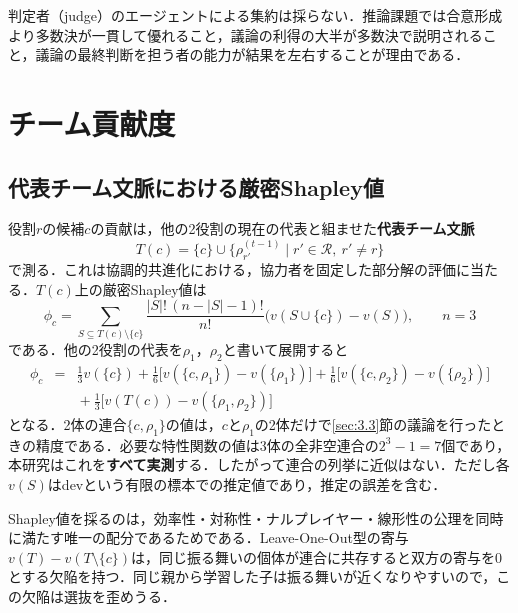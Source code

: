 判定者（judge）のエージェントによる集約は採らない．推論課題では合意形成より多数決が一貫して優れること\cite{kaesberg2025voting}，議論の利得の大半が多数決で説明されること\cite{choi2025debate}，議論の最終判断を担う者の能力が結果を左右すること\cite{judge2025bottleneck}が理由である．

\section{チーム貢献度}
\label{sec:3.4}

\subsection{代表チーム文脈における厳密Shapley値}
\label{sec:3.4.1}

役割$r$の候補$c$の貢献は，他の2役割の現在の代表と組ませた\textbf{代表チーム文脈}
\begin{equation}
T(c) = \{c\} \cup \{\rho_{r'}^{(t-1)} \mid r' \in \mathcal{R},\ r' \neq r\}
\label{eq:team}
\end{equation}
で測る．これは協調的共進化\cite{potter1994cooperative}における，協力者を固定した部分解の評価に当たる．$T(c)$上の厳密Shapley値\cite{shapley1953value}は
\begin{equation}
\phi_c = \sum_{S \subseteq T(c) \setminus \{c\}} \frac{|S|!\,(n - |S| - 1)!}{n!} \Big( v(S \cup \{c\}) - v(S) \Big), \qquad n = 3
\label{eq:shapley}
\end{equation}
である．他の2役割の代表を$\rho_1$，$\rho_2$と書いて展開すると
\begin{eqnarray}
\phi_c &=& \frac{1}{3} v(\{c\})
+ \frac{1}{6} \Big[ v(\{c,\rho_1\}) - v(\{\rho_1\}) \Big]
+ \frac{1}{6} \Big[ v(\{c,\rho_2\}) - v(\{\rho_2\}) \Big] \nonumber \\
&& {}+ \frac{1}{3} \Big[ v(T(c)) - v(\{\rho_1,\rho_2\}) \Big]
\label{eq:shapley3}
\end{eqnarray}
となる．2体の連合$\{c, \rho_1\}$の値は，$c$と$\rho_1$の2体だけで\ref{sec:3.3}節の議論を行ったときの精度である．必要な特性関数の値は3体の全非空連合の$2^3 - 1 = 7$個であり，本研究はこれを\textbf{すべて実測}する．したがって連合の列挙に近似はない．ただし各$v(S)$はdevという有限の標本での推定値であり，推定の誤差を含む．

Shapley値を採るのは，効率性・対称性・ナルプレイヤー・線形性の公理を同時に満たす唯一の配分であるためである\cite{shapley1953value,ghorbani2019data}．Leave-One-Out型の寄与$v(T) - v(T \setminus \{c\})$は，同じ振る舞いの個体が連合に共存すると双方の寄与を0とする欠陥を持つ\cite{ghorbani2019data}．同じ親から学習した子は振る舞いが近くなりやすいので，この欠陥は選抜を歪めうる．

